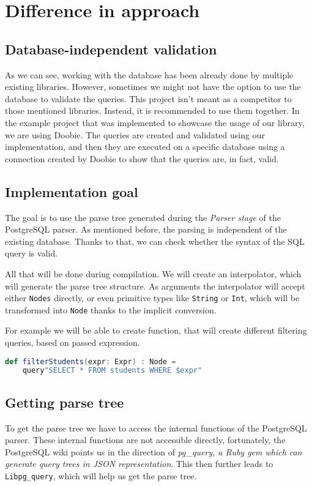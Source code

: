 \section{Difference in approach}
\subsection{Database-independent validation}
As we can see, working with the database has been already done by multiple existing libraries. However, sometimes we might not have the option to use the database to validate the queries. This project isn't meant as a competitor to those mentioned libraries. Instead, it is recommended to use them together. In the example project that was implemented to showcase the usage of our library, we are using Doobie. The queries are created and validated using our implementation, and then they are executed on a specific database using a connection created by Doobie to show that the queries are, in fact, valid.

\subsection{Implementation goal}
The goal is to use the parse tree generated during the \textit{Parser stage} of the PostgreSQL parser. As mentioned before, the parsing is independent of the existing database. Thanks to that, we can check whether the syntax of the SQL query is valid. 

All that will be done during compilation. We will create an interpolator, which will generate the parse tree structure. As arguments the interpolator will accept either \texttt{Nodes} directly, or even primitive types like \texttt{String} or \texttt{Int}, which will be transformed into \texttt{Node} thanks to the implicit conversion. 

For example we will be able to create function, that will create different filtering queries, based on passed expression. 
\begin{lstlisting}[language=scala, basicstyle=\ttfamily, showstringspaces=false]
def filterStudents(expr: Expr) : Node = 
    query"SELECT * FROM students WHERE $expr"
\end{lstlisting}

\subsection{Getting parse tree}
To get the parse tree we have to access the internal functions of the PostgreSQL parser. These internal functions are not accessible directly, fortunately, the PostgreSQL\cite{Postgres wiki} wiki points us in the direction of \textit{pg\_query, a Ruby gem which can generate query trees in JSON representation}. This then further leads to \texttt{Libpg\_query}, which will help us get the parse tree.

